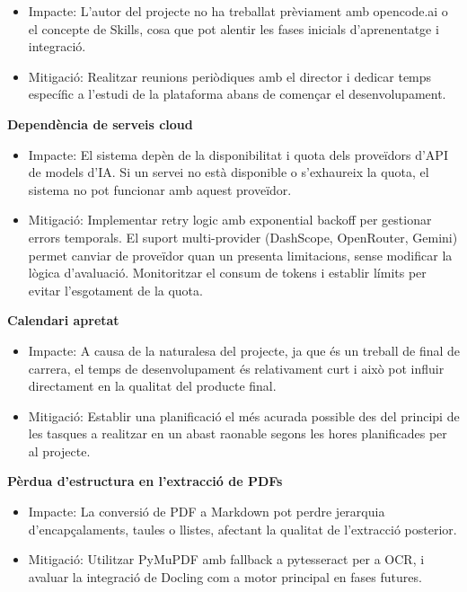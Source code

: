 \documentclass[12pt,a4paper,twoside]{report}
\begin{document}
\begin{itemize}
    \item Impacte: L'autor del projecte no ha treballat pr\`eviament amb opencode.ai o el concepte de Skills, cosa que pot alentir les fases inicials d'aprenentatge i integraci\'o.
    \item Mitigaci\'o: Realitzar reunions peri\`odiques amb el director i dedicar temps espec\'ific a l'estudi de la plataforma abans de comen\c{c}ar el desenvolupament.
\end{itemize}

\textbf{Depend\`encia de serveis cloud}

\begin{itemize}
    \item Impacte: El sistema dep\`en de la disponibilitat i quota dels prove\"idors d'API de models d'IA. Si un servei no est\`a disponible o s'exhaureix la quota, el sistema no pot funcionar amb aquest prove\"idor.
    \item Mitigaci\'o: Implementar retry logic amb exponential backoff per gestionar errors temporals. El suport multi-provider (DashScope, OpenRouter, Gemini) permet canviar de prove\"idor quan un presenta limitacions, sense modificar la l\`ogica d'avaluaci\'o. Monitoritzar el consum de tokens i establir l\'imits per evitar l'esgotament de la quota.
\end{itemize}

\textbf{Calendari apretat}

\begin{itemize}
    \item Impacte: A causa de la naturalesa del projecte, ja que \'es un treball de final de carrera, el temps de desenvolupament \'es relativament curt i aix\`o pot influir directament en la qualitat del producte final.
    \item Mitigaci\'o: Establir una planificaci\'o el m\'es acurada possible des del principi de les tasques a realitzar en un abast raonable segons les hores planificades per al projecte.
\end{itemize}

\textbf{P\`erdua d'estructura en l'extracci\'o de PDFs}

\begin{itemize}
    \item Impacte: La conversi\'o de PDF a Markdown pot perdre jerarquia d'encap\c{c}alaments, taules o llistes, afectant la qualitat de l'extracci\'o posterior.
    \item Mitigaci\'o: Utilitzar PyMuPDF amb fallback a pytesseract per a OCR, i avaluar la integraci\'o de Docling com a motor principal en fases futures.
\end{itemize}
\end{document}
